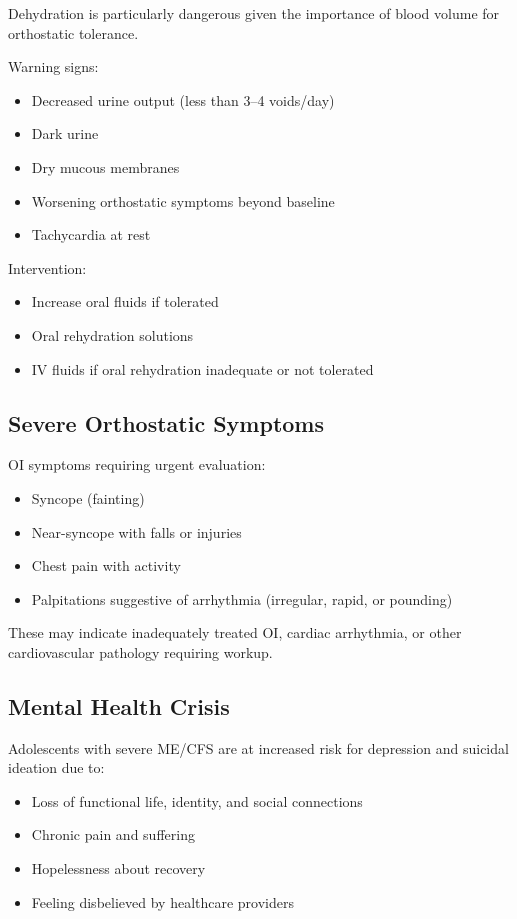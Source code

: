 Dehydration is particularly dangerous given the importance of blood volume for orthostatic tolerance.

Warning signs:
\begin{itemize}
    \item Decreased urine output (less than 3--4 voids/day)
    \item Dark urine
    \item Dry mucous membranes
    \item Worsening orthostatic symptoms beyond baseline
    \item Tachycardia at rest
\end{itemize}

Intervention:
\begin{itemize}
    \item Increase oral fluids if tolerated
    \item Oral rehydration solutions
    \item IV fluids if oral rehydration inadequate or not tolerated
\end{itemize}

\subsection{Severe Orthostatic Symptoms}

OI symptoms requiring urgent evaluation:
\begin{itemize}
    \item Syncope (fainting)
    \item Near-syncope with falls or injuries
    \item Chest pain with activity
    \item Palpitations suggestive of arrhythmia (irregular, rapid, or pounding)
\end{itemize}

These may indicate inadequately treated OI, cardiac arrhythmia, or other cardiovascular pathology requiring workup.

\subsection{Mental Health Crisis}

Adolescents with severe ME/CFS are at increased risk for depression and suicidal ideation due to:
\begin{itemize}
    \item Loss of functional life, identity, and social connections
    \item Chronic pain and suffering
    \item Hopelessness about recovery
    \item Feeling disbelieved by healthcare providers
\end{itemize}

